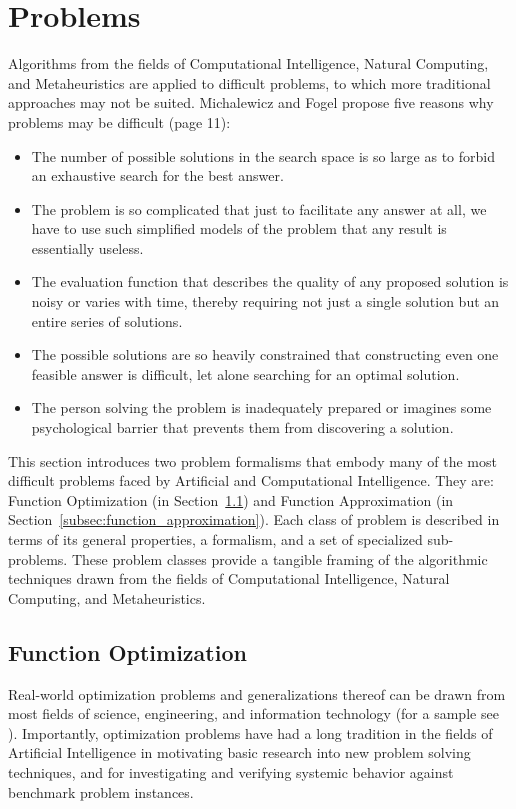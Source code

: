 % 
% 
\section{Problems}
\label{sec:problems}
Algorithms from the fields of Computational Intelligence, Natural Computing, and Metaheuristics are applied to difficult problems, to which more traditional approaches may not be suited.
Michalewicz and Fogel propose five reasons why problems may be difficult \cite{Michalewicz2004} (page 11):
\begin{itemize}
	\item The number of possible solutions in the search space is so large as to forbid an exhaustive search for the best answer.
	\item The problem is so complicated that just to facilitate any answer at all, we have to use such simplified models of the problem that any result is essentially useless.
	\item The evaluation function that describes the quality of any proposed solution is noisy or varies with time, thereby requiring not just a single solution but an entire series of solutions.
	\item The possible solutions are so heavily constrained that constructing even one feasible answer is difficult, let alone searching for an optimal solution.
	\item The person solving the problem is inadequately prepared or imagines some psychological barrier that prevents them from discovering a solution.
\end{itemize}

This section introduces two problem formalisms that embody many of the most difficult problems faced by Artificial and Computational Intelligence. They are: Function Optimization (in Section~\ref{subsec:function_optimization}) and Function Approximation (in Section~\ref{subsec:function_approximation}). Each class of problem is described in terms of its general properties, a formalism, and a set of specialized sub-problems. These problem classes provide a tangible framing of the algorithmic techniques drawn from the fields of Computational Intelligence, Natural Computing, and Metaheuristics.

% 
%
\subsection{Function Optimization}
\label{subsec:function_optimization}
Real-world optimization problems and generalizations thereof can be drawn from most fields of science, engineering, and information technology (for a sample see \cite{Ali1997, Toern1999}). Importantly, optimization problems have had a long tradition in the fields of Artificial Intelligence in motivating basic research into new problem solving techniques, and for investigating and verifying systemic behavior against benchmark problem instances.

